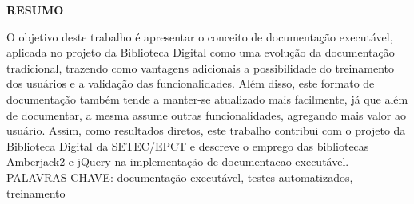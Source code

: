 \begin{center}
\textbf{RESUMO}
\end{center}
\singlespacing

\noindent O objetivo deste trabalho é apresentar o conceito de documentação executável, aplicada no projeto da Biblioteca Digital como uma evolução da documentação tradicional, trazendo como vantagens adicionais a possibilidade do treinamento dos usuários e a validação das funcionalidades. Além disso, este formato de documentação também tende a manter-se atualizado mais facilmente, já que além de documentar, a mesma assume outras funcionalidades, agregando mais valor ao usuário. Assim, como resultados diretos, este trabalho contribui com o projeto da Biblioteca Digital da SETEC/EPCT e descreve o emprego das bibliotecas Amberjack2 e jQuery na implementação de documentacao executável. \\

\noindent PALAVRAS-CHAVE: documentação executável, testes automatizados, treinamento
